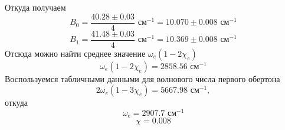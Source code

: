 Откуда получаем
\begin{equation}
B_0 = \dfrac{40.28 \pm 0.03}{4} \text{ см}^{-1} = 10.070 \pm 0.008 \text{ см$^{-1}$}
\end{equation}
\begin{equation}
B_1 = \dfrac{41.48 \pm 0.03}{4} \text{ см}^{-1} = 10.369 \pm 0.008 \text{ см$^{-1}$}
\end{equation}
Отсюда можно найти среднее значение $\omega_e(1-2\chi_e)$
\begin{equation}
\omega_e(1-2\chi_e) = 
2858.56
\text{ см$^{-1}$}
\end{equation}
Воспользуемся табличными данными для волнового числа первого обертона $$2\omega_e(1-3\chi_e) = 5667.98 \text{ см$^{-1}$},$$ откуда
\begin{equation}
\omega_e = 
2907.7
 \text{ см$^{-1}$}
\end{equation}
\begin{equation}
\chi = 
0.008
\end{equation}

